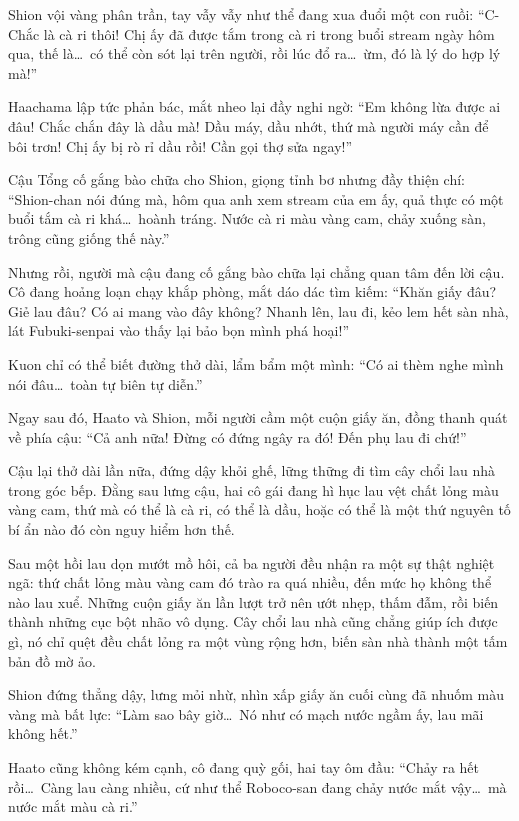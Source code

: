\documentclass[../main.tex]{subfiles}
\begin{document}
Shion vội vàng phân trần, tay vẫy vẫy như thể đang xua đuổi một con ruồi: ``C-Chắc là cà ri thôi! Chị ấy đã được tắm trong cà ri trong buổi stream ngày hôm qua, thế là\dots\ có thể còn sót lại trên người, rồi lúc đổ ra\dots\ ừm, đó là lý do hợp lý mà!''

Haachama lập tức phản bác, mắt nheo lại đầy nghi ngờ: ``Em không lừa được ai đâu! Chắc chắn đây là dầu mà! Dầu máy, dầu nhớt, thứ mà người máy cần để bôi trơn! Chị ấy bị rò rỉ dầu rồi! Cần gọi thợ sửa ngay!''

Cậu Tổng cố gắng bào chữa cho Shion, giọng tỉnh bơ nhưng đầy thiện chí: ``Shion-chan nói đúng mà, hôm qua anh xem stream của em ấy, quả thực có một buổi tắm cà ri khá\dots\ hoành tráng. Nước cà ri màu vàng cam, chảy xuống sàn, trông cũng giống thế này.''

Nhưng rồi, người mà cậu đang cố gắng bào chữa lại chẳng quan tâm đến lời cậu. Cô đang hoảng loạn chạy khắp phòng, mắt dáo dác tìm kiếm: ``Khăn giấy đâu? Giẻ lau đâu? Có ai mang vào đây không? Nhanh lên, lau đi, kẻo lem hết sàn nhà, lát Fubuki-senpai vào thấy lại bảo bọn mình phá hoại!''

Kuon chỉ có thể biết đường thở dài, lẩm bẩm một mình: ``Có ai thèm nghe mình nói đâu\dots\ toàn tự biên tự diễn.''

Ngay sau đó, Haato và Shion,  mỗi người cầm một cuộn giấy ăn, đồng thanh quát về phía cậu: ``Cả anh nữa! Đừng có đứng ngây ra đó! Đến phụ lau đi chứ!''

Cậu lại thở dài lần nữa, đứng dậy khỏi ghế, lững thững đi tìm cây chổi lau nhà trong góc bếp. Đằng sau lưng cậu, hai cô gái đang hì hục lau vệt chất lỏng màu vàng cam, thứ mà có thể là cà ri, có thể là dầu, hoặc có thể là một thứ nguyên tố bí ẩn nào đó còn nguy hiểm hơn thế.

\ct

Sau một hồi lau dọn mướt mồ hôi, cả ba người đều nhận ra một sự thật nghiệt ngã: thứ chất lỏng màu vàng cam đó trào ra quá nhiều, đến mức họ không thể nào lau xuể. Những cuộn giấy ăn lần lượt trở nên ướt nhẹp, thấm đẫm, rồi biến thành những cục bột nhão vô dụng. Cây chổi lau nhà cũng chẳng giúp ích được gì, nó chỉ quệt đều chất lỏng ra một vùng rộng hơn, biến sàn nhà thành một tấm bản đồ mờ ảo.

Shion đứng thẳng dậy, lưng mỏi nhừ, nhìn xấp giấy ăn cuối cùng đã nhuốm màu vàng mà bất lực: ``Làm sao bây giờ\dots\ Nó như có mạch nước ngầm ấy, lau mãi không hết.''

Haato cũng không kém cạnh, cô đang quỳ gối, hai tay ôm đầu: ``Chảy ra hết rồi\dots\ Càng lau càng nhiều, cứ như thể Roboco-san đang chảy nước mắt vậy\dots\ mà nước mắt màu cà ri.''
\end{document}
